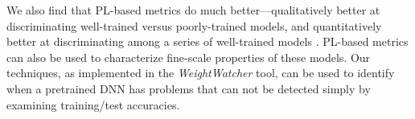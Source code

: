 We also find that PL-based metrics do much better---qualitatively better at discriminating well-trained versus poorly-trained models, and quantitatively better at discriminating among a series of well-trained models .
PL-based metrics can also be used to characterize fine-scale properties of these models.
Our techniques, as implemented in the \emph{WeightWatcher} tool, can be used to identify when a pretrained DNN has problems that can not be detected simply by examining training/test accuracies.


